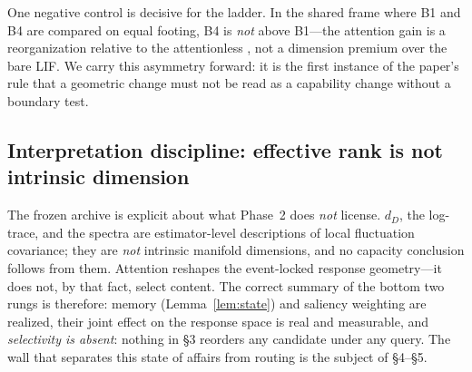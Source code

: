 One negative control is decisive for the ladder. In the shared frame where
B1 and B4 are compared on equal footing, B4 is \emph{not} above B1---the
attention gain is a reorganization relative to the attentionless \TAN{},
not a dimension premium over the bare LIF. We carry this asymmetry forward:
it is the first instance of the paper's rule that a geometric change must
not be read as a capability change without a boundary test.

\subsection{Interpretation discipline: effective rank is not intrinsic
dimension}
\label{sec:discipline}

The frozen archive is explicit about what Phase~2 does \emph{not} license.
$d_D$, the log-trace, and the spectra are estimator-level descriptions of
local fluctuation covariance; they are \emph{not} intrinsic manifold
dimensions, and no capacity conclusion follows from them. Attention
reshapes the event-locked response geometry---it does not, by that fact,
select content. The correct summary of the bottom two rungs is therefore:
memory (Lemma~\ref{lem:state}) and saliency weighting are realized, their
joint effect on the response space is real and measurable, and
\emph{selectivity is absent}: nothing in §3 reorders any candidate under
any query. The wall that separates this state of affairs from routing is
the subject of §4--§5.
